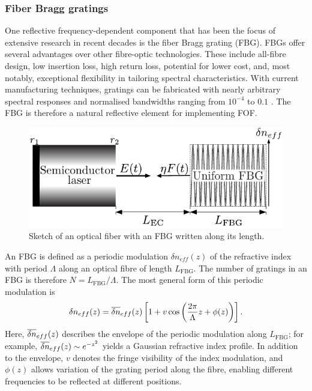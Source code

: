 \subsubsection*{Fiber Bragg gratings}
\label{subsubsec:FBG}
%
One reflective frequency-dependent component that has been the focus of extensive research in recent decades is the fiber Bragg grating (FBG).
FBGs offer several advantages over other fibre-optic technologies.
These include all-fibre design, low insertion loss, high return loss, potential for lower cost, and, most notably, exceptional flexibility in tailoring spectral characteristics.
With current manufacturing techniques, gratings can be fabricated with nearly arbitrary spectral responses and normalised bandwidths ranging from $10^{-4}$ to $0.1$ \cite{erdogan1997fiber}.
The FBG is therefore a natural reflective element for implementing FOF.
%
\begin{figure}
    \centering 
    \includegraphics[width=\linewidth]{Images/FBG_setup_dneff_only_1col.pdf}
    \caption{Sketch of an optical fiber with an FBG written along its length.}
    \label{fig:FBG_setup}
\end{figure}
%
\par
%
An FBG is defined as a periodic modulation $\delta n_{eff}(z)$ of the refractive index with period $\Lambda$ along an optical fibre of length $L_\text{FBG}$.
The number of gratings in an FBG is therefore $N = L_\text{FBG}/\Lambda$. The most general form of this periodic modulation is
%
\begin{equation}
\label{eq:dneff}
    \delta n_{eff}(z) = \overline{\delta n}_{eff}(z) \left[ 1 + v \cos{\left( \frac{2 \pi}{\Lambda} z + \phi(z) \right)} \right].
\end{equation}
%
Here, $\overline{\delta n}_{eff}(z)$ describes the envelope of the periodic modulation along $L_\text{FBG}$; for example, $\overline{\delta n}_{eff}(z) \sim e^{-z^2}$ yields a Gaussian refractive index profile. 
In addition to the envelope, $v$ denotes the fringe visibility of the index modulation, and $\phi(z)$ allows variation of the grating period along the fibre, enabling different frequencies to be reflected at different positions.
